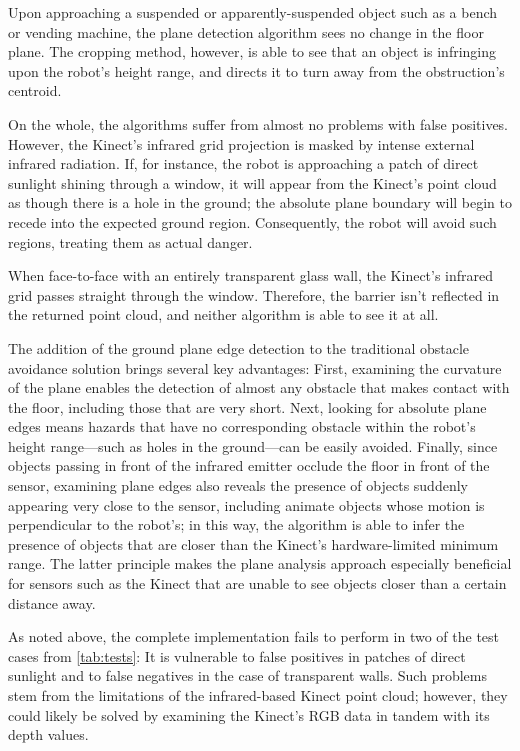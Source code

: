 \documentclass[12pt]{report}
\begin{document}
Upon approaching a suspended or apparently-suspended object such as a bench or vending machine, the plane detection algorithm sees no change in the floor plane.  The cropping method, however, is able to see that an object is infringing upon the robot's height range, and directs it to turn away from the obstruction's centroid.

On the whole, the algorithms suffer from almost no problems with false positives.  However, the Kinect's infrared grid projection is masked by intense external infrared radiation.  If, for instance, the robot is approaching a patch of direct sunlight shining through a window, it will appear from the Kinect's point cloud as though there is a hole in the ground; the absolute plane boundary will begin to recede into the expected ground region.  Consequently, the robot will avoid such regions, treating them as actual danger.

When face-to-face with an entirely transparent glass wall, the Kinect's infrared grid passes straight through the window.  Therefore, the barrier isn't reflected in the returned point cloud, and neither algorithm is able to see it at all.

The addition of the ground plane edge detection to the traditional obstacle avoidance solution brings several key advantages:  First, examining the curvature of the plane enables the detection of almost any obstacle that makes contact with the floor, including those that are very short.  Next, looking for absolute plane edges means hazards that have no corresponding obstacle within the robot's height range---such as holes in the ground---can be easily avoided.  Finally, since objects passing in front of the infrared emitter occlude the floor in front of the sensor, examining plane edges also reveals the presence of objects suddenly appearing very close to the sensor, including animate objects whose motion is perpendicular to the robot's; in this way, the algorithm is able to infer the presence of objects that are closer than the Kinect's hardware-limited minimum range.  The latter principle makes the plane analysis approach especially beneficial for sensors such as the Kinect that are unable to see objects closer than a certain distance away.

As noted above, the complete implementation fails to perform in two of the test cases from \autoref{tab:tests}:  It is vulnerable to false positives in patches of direct sunlight and to false negatives in the case of transparent walls.  Such problems stem from the limitations of the infrared-based Kinect point cloud; however, they could likely be solved by examining the Kinect's RGB data in tandem with its depth values.
\end{document}
